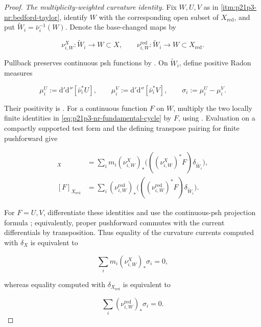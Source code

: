 \begin{proof}
\smallskip
\emph{The multiplicity-weighted curvature identity.}
Fix \(W,U,V\) as in \cref{itm:p21p3-nr:bedford-taylor}, identify \(W\)
with the corresponding open subset of \(X_{\mathrm{red}}\), and put
\(\widetilde W_i=\bar\nu_i^{-1}(W)\).  Denote the base-changed maps by

\[
 \nu_{i,W}^{X}:\widetilde W_i\longrightarrow W\subset X,
 \qquad
 \nu_{i,W}^{\mathrm{red}}:\widetilde W_i\longrightarrow
                         W\subset X_{\mathrm{red}}.
\]

Pullback preserves continuous psh functions by
\cite[Proposition~8.1.5]{CLD25}.  On \(\widetilde W_i\), define positive
Radon measures

\[
 \mu_i^U:=\mathrm d'\mathrm d''[\bar\nu_i^*U],
 \qquad
 \mu_i^V:=\mathrm d'\mathrm d''[\bar\nu_i^*V],
 \qquad
 \sigma_i:=\mu_i^U-\mu_i^V.
\]

Their positivity is \cite[Lemma~8.5.5]{CLD25}.  For a continuous function
\(F\) on \(W\), multiply the two locally finite identities in
\eqref{eq:p21p3-nr-fundamental-cycle} by \(F\), using
\cite[Example~7.2.12]{CLD25}.  Evaluation on a compactly supported test
form and the defining transpose pairing for finite pushforward give

\begin{align}
 [F]_X
   &=\sum_i m_i(\nu_{i,W}^{X})_*
       \bigl(((\nu_{i,W}^{X})^*F)\delta_{\widetilde W_i}\bigr),
 \label{eq:p21p3-nr-function-current-X}\\
 [F]_{X_{\mathrm{red}}}
   &=\sum_i(\nu_{i,W}^{\mathrm{red}})_*
       \bigl(((\nu_{i,W}^{\mathrm{red}})^*F)
                    \delta_{\widetilde W_i}\bigr).
 \label{eq:p21p3-nr-function-current-red}
\end{align}

For \(F=U,V\), differentiate these identities and use the continuous-psh
projection formula \cite[Proposition~8.5.6]{CLD25}; equivalently, proper
pushforward commutes with the current differentials by transposition.
Thus equality of the curvature currents computed with \(\delta_X\) is
equivalent to

\begin{equation}
\label{eq:p21p3-nr-weighted-measure-sum}
                       \sum_i m_i(\nu_{i,W}^{X})_*\sigma_i=0,
\end{equation}

whereas equality computed with \(\delta_{X_{\mathrm{red}}}\) is
equivalent to

\begin{equation}
\label{eq:p21p3-nr-unweighted-measure-sum}
                       \sum_i
                         (\nu_{i,W}^{\mathrm{red}})_*\sigma_i=0.
\end{equation}


\end{proof}
